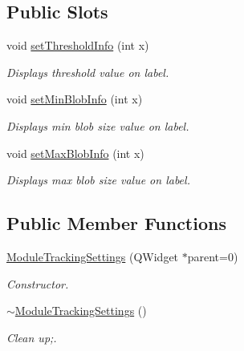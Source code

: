 \subsection*{Public Slots}
\begin{DoxyCompactItemize}
\item 
void \hyperlink{class_module_tracking_settings_a7c6c49419ff2983fc19fb2c13895c9ee}{setThresholdInfo} (int x)
\begin{DoxyCompactList}\small\item\em Displays threshold value on label. \item\end{DoxyCompactList}\item 
void \hyperlink{class_module_tracking_settings_a43a17bb81165c5e135ba9faca9e01e11}{setMinBlobInfo} (int x)
\begin{DoxyCompactList}\small\item\em Displays min blob size value on label. \item\end{DoxyCompactList}\item 
void \hyperlink{class_module_tracking_settings_a24b6f31366146f1d1634c74fe9d6f57d}{setMaxBlobInfo} (int x)
\begin{DoxyCompactList}\small\item\em Displays max blob size value on label. \item\end{DoxyCompactList}\end{DoxyCompactItemize}
\subsection*{Public Member Functions}
\begin{DoxyCompactItemize}
\item 
\hyperlink{class_module_tracking_settings_aee6f4936c048ff25b967313d3b22b1a6}{ModuleTrackingSettings} (QWidget $\ast$parent=0)
\begin{DoxyCompactList}\small\item\em Constructor. \item\end{DoxyCompactList}\item 
\hypertarget{class_module_tracking_settings_aaac793ca21aeaf01ac06f26e858f8055}{
\hyperlink{class_module_tracking_settings_aaac793ca21aeaf01ac06f26e858f8055}{$\sim$ModuleTrackingSettings} ()}
\label{db/d02/class_module_tracking_settings_aaac793ca21aeaf01ac06f26e858f8055}

\begin{DoxyCompactList}\small\item\em Clean up;. \item\end{DoxyCompactList}\end{DoxyCompactItemize}
